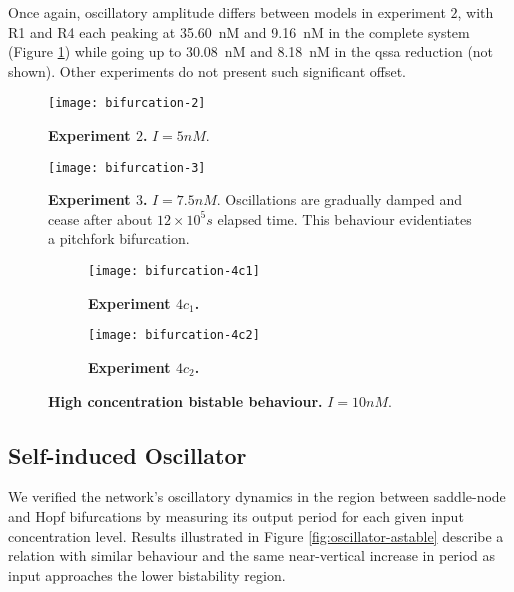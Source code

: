     Once again, oscillatory amplitude differs between models in experiment $2$, with R1 and R4 each peaking at \SI{35.60}{\nano M} and \SI{9.16}{\nano M} in the complete system (Figure \ref{fig:bifurcation-2}) while going up to \SI{30.08}{\nano M} and \SI{8.18}{\nano M} in the \ac{qssa} reduction (not shown).
    Other experiments do not present such significant offset. %

    \begin{figure}[!htbp]
      \centering
      \texttt{[image: bifurcation-2]}
      \caption{\textbf{Experiment $2$.} $I = 5 nM$.}
      \label{fig:bifurcation-2}
    \end{figure}

    \begin{figure}[!htbp]
      \centering
      \texttt{[image: bifurcation-3]}
      \caption{\textbf{Experiment $3$.} $I = 7.5nM$. Oscillations are gradually damped and cease after about $12 \times 10^5 s$ elapsed time. This behaviour evidentiates a pitchfork bifurcation.}
      \label{fig:bifurcation-3}
    \end{figure}

    \begin{figure}[!htb]
      \centering
      \begin{subfigure}[t]{0.7\textwidth}
        \centering
        \texttt{[image: bifurcation-4c1]}
        \caption{\textbf{Experiment $4c_{1}$.}}
        \label{fig:bifurcation-4c1}
      \end{subfigure}
      \begin{subfigure}[t]{0.7\textwidth}
        \centering
        \texttt{[image: bifurcation-4c2]}
        \caption{\textbf{Experiment $4c_{2}$.}}
        \label{fig:bifurcation-4c2}
      \end{subfigure}
      \caption{\textbf{High concentration bistable behaviour.} $I = 10 nM$.}
      \label{fig:bifurcation-4}
    \end{figure}


  \subsection{Self-induced Oscillator}

    We verified the network's oscillatory dynamics in the region between saddle-node and Hopf bifurcations by measuring its output period for each given input concentration level.
    Results illustrated in Figure \ref{fig:oscillator-astable} describe a relation with similar behaviour and the same near-vertical increase in period as input approaches the lower bistability region. %


